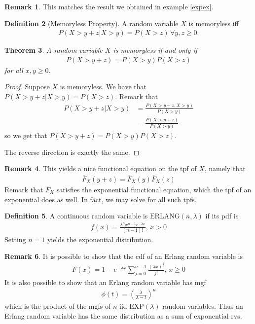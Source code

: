 \documentclass[11pt]{amsart}
\newtheorem{theorem}{Theorem}[section]
\theoremstyle{definition}
\newtheorem{definition}[theorem]{Definition}
\newtheorem{remark}[theorem]{Remark}
\numberwithin{equation}{section}
\begin{document}
 \begin{remark}
     This matches the result we obtained in example \ref{expex}.
 \end{remark}
 \begin{definition}[Memoryless Property]
     A random variable $X$ is memoryless iff
     \begin{align*}
         P(X>y+z|X>y)=P(X>z)\,\forall y,z\ge 0.
     \end{align*}
 \end{definition}
 \begin{theorem}
     A random variable $X$ is memoryless if and only if 
     \begin{align*}
         P(X>y+z)=P(X>y)P(X>z)
     \end{align*}
     for all $x,y\ge 0$.
 \end{theorem}
 \begin{proof}
     Suppose $X$ is memoryless. We have that $P(X>y+z|X>y)=P(X>z)$. Remark that
     \begin{align*}
         P(X>y+z|X>y)&=\frac{P(X>y+z,X>y)}{P(X>y)}\\
         &=\frac{P(X>y+z)}{P(X>y)}
     \end{align*}
     so we get that $P(X>y+z)=P(X>y)P(X>z)$.

     The reverse direction is exactly the same.
 \end{proof}
 \begin{remark}
     This yields a nice functional equation on the tpf of $X$, namely that
     \begin{align*}
         \overline{F}_X(y+z)=\overline{F}_X(y)\overline{F}_X(z)
     \end{align*}
     Remark that $\overline{F}_X$ satisfies the exponential functional equation, which the tpf of an exponential does as well. In fact, we may solve for all such tpfs. 
 \end{remark}
 \begin{definition}
     A continuous random variable is $\mathrm{ERLANG}(n,\lambda)$ if its pdf is
     \begin{align*}
         f(x)=\frac{\lambda^nx^{n-1}e^{-\lambda x}}{(n-1)!},\,x>0
     \end{align*}
     Setting $n=1$ yields the exponential distribution.
 \end{definition}
 \begin{remark}
     It is possible to show that the cdf of an Erlang random variable is
     \begin{align*}
         F(x)=1-e^{-\lambda x}\sum_{j=0}^{n-1}\frac{(\lambda x)^j}{j!},\,x\ge 0
     \end{align*}
     It is also possible to show that an Erlang random variable has mgf 
     \begin{align*}
         \phi(t)=\left(\frac{\lambda}{\lambda-t}\right)^n
     \end{align*}
     which is the product of the mgfs of $n$ iid $\mathrm{EXP}(\lambda)$ random variables. Thus an Erlang random variable has the same distribution as a sum of exponential rvs.
 \end{remark}
\end{document}
